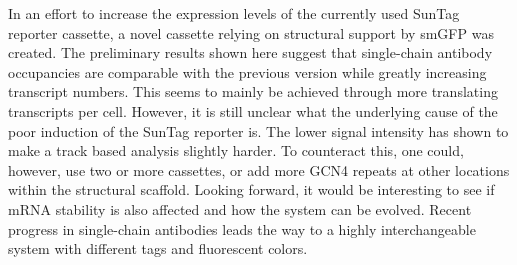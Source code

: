 In an effort to increase the expression levels of the currently used SunTag reporter cassette, a novel cassette relying on structural support by smGFP was created.
The preliminary results shown here suggest that single-chain antibody occupancies are comparable with the previous version while greatly increasing transcript numbers.
This seems to mainly be achieved through more translating transcripts per cell.
However, it is still unclear what the underlying cause of the poor induction of the SunTag reporter is.
The lower signal intensity has shown to make a track based analysis slightly harder.
To counteract this, one could, however, use two or more cassettes, or add more GCN4 repeats at other locations within the structural scaffold.
Looking forward, it would be interesting to see if mRNA stability is also affected and how the system can be evolved.
Recent progress in single-chain antibodies leads the way to a highly interchangeable system with different tags and fluorescent colors.
